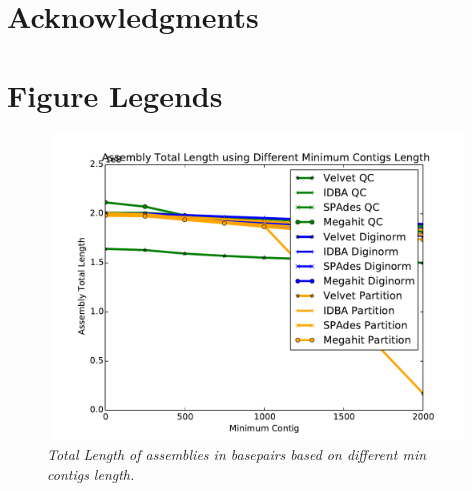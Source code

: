 
\section*{Acknowledgments}



%
%
% 





\section*{Figure Legends}
%
\begin{figure} [h] 
 
\begin{center}  
 

\includegraphics[height=3.2in,width=4.5in]{total-length-contigs.pdf}  
\caption{\small \sl Total Length of assemblies in basepairs based on different min contigs length.\label{fig:mincontig}}  
\end{center}  
\end{figure}  
 

